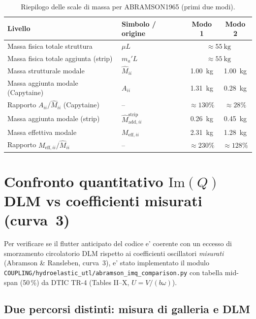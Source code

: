 \documentclass[11pt,a4paper]{article}
\begin{document}
\begin{table}[H]
  \centering
  \caption{Riepilogo delle scale di massa per ABRAMSON1965 (primi due modi).}
  \label{tab:mass-scales}
  \begin{tabular}{llcc}
    \toprule
    Livello & Simbolo / origine & Modo 1 & Modo 2 \\
    \midrule
    Massa fisica totale struttura & $\mu L$ & \multicolumn{2}{c}{$\approx\SI{55}{\kilogram}$} \\
    Massa fisica totale aggiunta (strip) & $m_a'L$ & \multicolumn{2}{c}{$\approx\SI{55}{\kilogram}$} \\
    \midrule
    Massa strutturale modale & $\hat{M}_{ii}$ & \SI{1.00}{\kilogram} & \SI{1.00}{\kilogram} \\
    Massa aggiunta modale (Capytaine) & $A_{ii}$ & \SI{1.31}{\kilogram} & \SI{0.28}{\kilogram} \\
    Rapporto $A_{ii}/\hat{M}_{ii}$ (Capytaine) & -- & $\approx 130\%$ & $\approx 28\%$ \\
    Massa aggiunta modale (strip) & $\hat{M}_{\mathrm{add},ii}^{\mathrm{strip}}$ & \SI{0.26}{\kilogram} & \SI{0.45}{\kilogram} \\
    Massa effettiva modale & $M_{\mathrm{eff},ii}$ & \SI{2.31}{\kilogram} & \SI{1.28}{\kilogram} \\
    Rapporto $M_{\mathrm{eff},ii}/\hat{M}_{ii}$ & -- & $\approx 230\%$ & $\approx 128\%$ \\
    \bottomrule
  \end{tabular}
\end{table}

\section{Confronto quantitativo $\mathrm{Im}(Q)$ DLM vs coefficienti misurati (curva~3)}
\label{sec:imq-measured}

Per verificare se il flutter anticipato del codice e' coerente con un eccesso di
smorzamento circolatorio DLM rispetto ai coefficienti oscillatori \emph{misurati}
(Abramson \& Ransleben, curva~3), e' stato implementato il modulo
\texttt{COUPLING/hydroelastic\_utl/abramson\_imq\_comparison.py} con tabella
mid-span (50\,\%) da DTIC TR-4 (Tables II--X, $U=V/(b\omega)$).

\subsection{Due percorsi distinti: misura di galleria e DLM}
\end{document}
